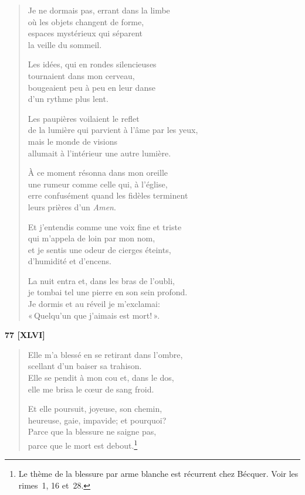 \begin{verse}
  Je ne dormais pas, errant dans la limbe \\
  où les objets changent de forme, \\
  espaces mystérieux qui séparent \\
  la veille du sommeil.

  Les idées, qui en rondes silencieuses \\
  tournaient dans mon cerveau, \\
  bougeaient peu à peu en leur danse \\
  d'un rythme plus lent.

  Les paupières voilaient le reflet \\
  de la lumière qui parvient à l'âme par les yeux, \\
  mais le monde de visions \\
  allumait à l'intérieur une autre lumière.

  À ce moment résonna dans mon oreille \\
  une rumeur comme celle qui, à l'église, \\
  erre confusément quand les fidèles terminent \\
  leurs prières d'un \emph{Amen}.

  Et j'entendis comme une voix fine et triste \\
  qui m'appela de loin par mon nom, \\
  et je sentis une odeur de cierges éteints, \\
  d'humidité et d'encens.

  La nuit entra et, dans les bras de l'oubli, \\
  je tombai tel une pierre en son sein profond. \\
  Je dormis et au réveil je m'exclamai: \\
  «\,Quelqu'un que j'aimais est mort!\,».
\end{verse}

\bigskip

\begin{center}
  \textbf{77 [XLVI]}
\end{center}


\begin{verse}
  Elle m'a blessé en se retirant dans l'ombre, \\
  scellant d'un baiser sa trahison. \\
  Elle se pendit à mon cou et, dans le dos, \\
  elle me brisa le cœur de sang froid.

  Et elle poursuit, joyeuse, son chemin, \\
  heureuse, gaie, impavide; et pourquoi? \\
  Parce que la blessure ne saigne pas, \\
  parce que le mort est debout.\footnote{Le thème de la blessure
  par arme blanche est récurrent chez Bécquer. Voir les rimes~1, 16
  et~28.}
\end{verse}

